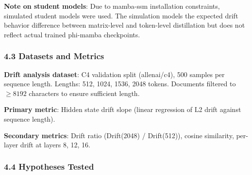 \textbf{Note on student models}: Due to mamba-ssm installation constraints, simulated student models were used. The simulation models the expected drift behavior difference between matrix-level and token-level distillation but does not reflect actual trained phi-mamba checkpoints.

\subsubsection{4.3 Datasets and Metrics}

\textbf{Drift analysis dataset}: C4 validation split (allenai/c4), 500 samples per sequence length. Lengths: 512, 1024, 1536, 2048 tokens. Documents filtered to $\geq 8192$ characters to ensure sufficient length.

\textbf{Primary metric}: Hidden state drift slope (linear regression of L2 drift against sequence length).

\textbf{Secondary metrics}: Drift ratio (Drift(2048) / Drift(512)), cosine similarity, per-layer drift at layers 8, 12, 16.

\subsubsection{4.4 Hypotheses Tested}

\begin{table}[htbp]
\centering
{}
\end{table}

